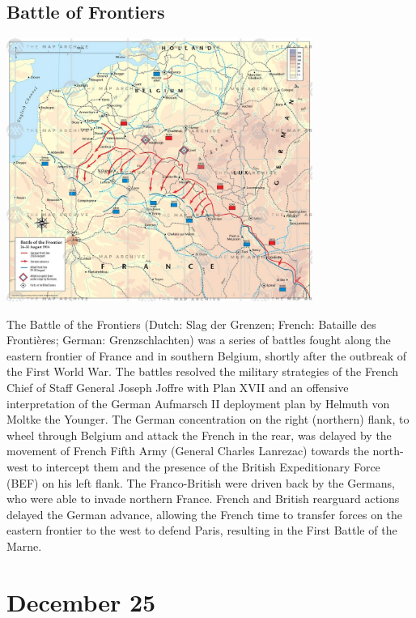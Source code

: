 \documentclass[11pt]{report}
\begin{document}
\subsection{Battle of Frontiers}
\vspace{2mm}\begin{center}\includegraphics[width=10cm]{./img/battleOfFrontier.jpg}\end{center}
The Battle of the Frontiers (Dutch: Slag der Grenzen; French: Bataille des Frontières; German: Grenzschlachten) was a series of battles fought along the eastern frontier of France and in southern Belgium, shortly after the outbreak of the First World War. The battles resolved the military strategies of the French Chief of Staff General Joseph Joffre with Plan XVII and an offensive interpretation of the German Aufmarsch II deployment plan by Helmuth von Moltke the Younger. The German concentration on the right (northern) flank, to wheel through Belgium and attack the French in the rear, was delayed by the movement of French Fifth Army (General Charles Lanrezac) towards the north-west to intercept them and the presence of the British Expeditionary Force (BEF) on his left flank. The Franco-British were driven back by the Germans, who were able to invade northern France. French and British rearguard actions delayed the German advance, allowing the French time to transfer forces on the eastern frontier to the west to defend Paris, resulting in the First Battle of the Marne.

\section{December 25}
\end{document}
